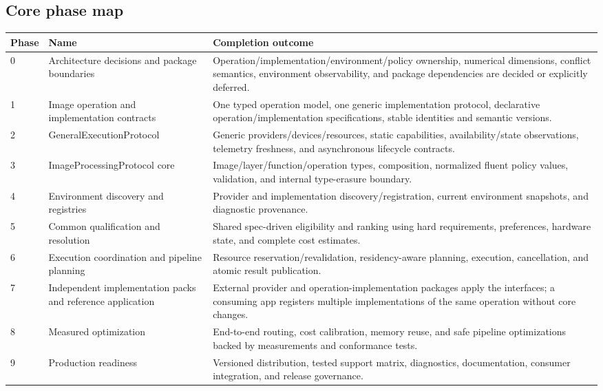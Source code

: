 \subsection{Core phase map}

\begin{longtable}{@{}L{0.08\textwidth}L{0.27\textwidth}p{0.54\textwidth}@{}}
\toprule
\textbf{Phase} & \textbf{Name} & \textbf{Completion outcome} \\
 & Architecture decisions and package boundaries & Operation/implementation/environment/policy ownership, numerical dimensions, conflict semantics, environment observability, and package dependencies are decided or explicitly deferred. \\
1 & Image operation and implementation contracts & One typed operation model, one generic implementation protocol, declarative operation/implementation specifications, stable identities and semantic versions. \\
2 & GeneralExecutionProtocol & Generic providers/devices/resources, static capabilities, availability/state observations, telemetry freshness, and asynchronous lifecycle contracts. \\
3 & ImageProcessingProtocol core & Image/layer/function/operation types, composition, normalized fluent policy values, validation, and internal type-erasure boundary. \\
4 & Environment discovery and registries & Provider and implementation discovery/registration, current environment snapshots, and diagnostic provenance. \\
5 & Common qualification and resolution & Shared spec-driven eligibility and ranking using hard requirements, preferences, hardware state, and complete cost estimates. \\
6 & Execution coordination and pipeline planning & Resource reservation/revalidation, residency-aware planning, execution, cancellation, and atomic result publication. \\
7 & Independent implementation packs and reference application & External provider and operation-implementation packages apply the interfaces; a consuming app registers multiple implementations of the same operation without core changes. \\
8 & Measured optimization & End-to-end routing, cost calibration, memory reuse, and safe pipeline optimizations backed by measurements and conformance tests. \\
9 & Production readiness & Versioned distribution, tested support matrix, diagnostics, documentation, consumer integration, and release governance. \\
\bottomrule
\end{longtable}

